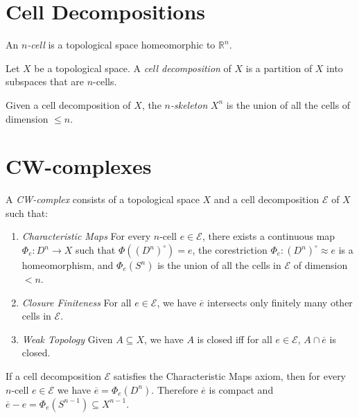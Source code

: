 \section{Cell Decompositions}

\begin{df}[$n$-cell]
An \emph{$n$-cell} is a topological space homeomorphic to $\mathbb{R}^n$.
\end{df}

\begin{df}
Let $X$ be a topological space. A \emph{cell decomposition} of $X$ is a partition of $X$ into subspaces that are $n$-cells.
\end{df}

\begin{df}[$n$-skeleton]
Given a cell decomposition of $X$, the \emph{$n$-skeleton} $X^n$ is the union of all the cells of dimension $\leq n$.
\end{df}

\section{CW-complexes}

\begin{df}[CW-Complex]
A \emph{CW-complex} consists of a topological space $X$ and a cell decomposition $\mathcal{E}$ of $X$ such that:
\begin{enumerate}
\item \emph{Characteristic Maps} For every $n$-cell $e \in \mathcal{E}$, there exists a continuous map $\Phi_e : D^n \rightarrow X$ such that $\Phi((D^n)^\circ) = e$, the corestriction $\Phi_e : (D^n)^\circ \approx e$ is a homeomorphism, and $\Phi_e(S^n)$ is the union of all the cells in $\mathcal{E}$ of dimension $< n$.
\item \emph{Closure Finiteness} For all $e \in \mathcal{E}$, we have $\overline{e}$ intersects only finitely many other cells in $\mathcal{E}$.
\item \emph{Weak Topology} Given $A \subseteq X$, we have $A$ is closed iff for all $e \in \mathcal{E}$, $A \cap \overline{e}$ is closed.
\end{enumerate}
\end{df}

\begin{prop}
If a cell decomposition $\mathcal{E}$ satisfies the Characteristic Maps axiom, then for every $n$-cell $e \in \mathcal{E}$ we have $\overline{e} = \Phi_e(D^n)$. Therefore $\overline{e}$ is compact and $\overline{e} - e = \Phi_e(S^{n-1}) \subseteq X^{n-1}$.
\end{prop}

